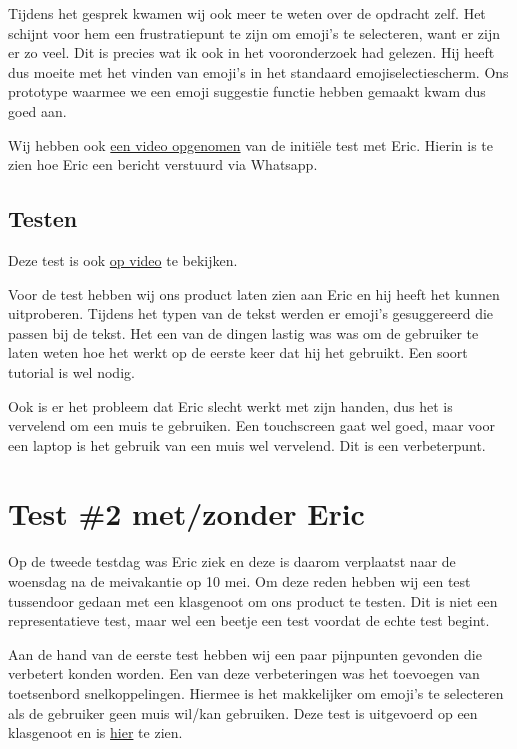 \documentclass[12pt]{article}
\begin{document}
Tijdens het gesprek kwamen wij ook meer te weten over de opdracht zelf.
Het schijnt voor hem een frustratiepunt te zijn om emoji's te selecteren, want er zijn er zo veel.
Dit is precies wat ik ook in het vooronderzoek had gelezen.
Hij heeft dus moeite met het vinden van emoji's in het standaard emojiselectiescherm.
Ons prototype waarmee we een emoji suggestie functie hebben gemaakt kwam dus goed aan.

Wij hebben ook \href{https://cdn.nicecock.eu/hcd/hcd/Attachments/initiele-test-stuur-bericht.mp4}{een video opgenomen} van de initiële test met Eric.
Hierin is te zien hoe Eric een bericht verstuurd via Whatsapp.

\subsection{Testen}

Deze test is ook \href{https://cdn.nicecock.eu/hcd/hcd/Attachments/test-not-working-ai.mp4}{op video} te bekijken. 

Voor de test hebben wij ons product laten zien aan Eric en hij heeft het kunnen uitproberen.
Tijdens het typen van de tekst werden er emoji's gesuggereerd die passen bij de tekst.
Het een van de dingen lastig was was om de gebruiker te laten weten hoe het werkt op de eerste keer dat hij het gebruikt.
Een soort tutorial is wel nodig.

Ook is er het probleem dat Eric slecht werkt met zijn handen, dus het is vervelend om een muis te gebruiken.
Een touchscreen gaat wel goed, maar voor een laptop is het gebruik van een muis wel vervelend.
Dit is een verbeterpunt.

\section{Test \#2 met/zonder Eric}

Op de tweede testdag was Eric ziek en deze is daarom verplaatst naar de woensdag na de meivakantie op 10 mei.
Om deze reden hebben wij een test tussendoor gedaan met een klasgenoot om ons product te testen.
Dit is niet een representatieve test, maar wel een beetje een test voordat de echte test begint.

Aan de hand van de eerste test hebben wij een paar pijnpunten gevonden die verbetert konden worden.
Een van deze verbeteringen was het toevoegen van toetsenbord snelkoppelingen.
Hiermee is het makkelijker om emoji's te selecteren als de gebruiker geen muis wil/kan gebruiken.
Deze test is uitgevoerd op een klasgenoot en is \href{https://cdn.nicecock.eu/hcd/hcd/Attachments/kb-shortcut-test-ting.mp4}{hier} te zien.
\end{document}
